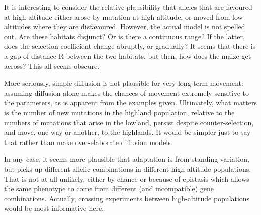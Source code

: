 \documentclass[onecolumn,oneside,letterpaper]{article}
\begin{document}
It is interesting to consider the relative plausibility that alleles that are favoured at high altitude either arose by mutation at high altitude, 
or moved from low altitudes where they are disfavoured.  
However, the actual model is not spelled out.  
Are these habitats disjunct?  
Or is there a continuous range? 
If the latter, does the selection coefficient change abruptly, or gradually?  
It seems that there is a gap of distance R between the two habitats, but then, how does the maize get across?  
This all seems obscure. 



More seriously, simple diffusion is not plausible for very long-term movement: 
assuming diffusion alone makes the chances of movement extremely sensitive to the parameters, 
as is apparent from the examples given.  
Ultimately, what matters is the number of new mutations in the highland population, 
relative to the numbers of mutations that arise in the lowland, 
persist despite counter-selection, and move, one way or another, to the highlands.  
It would be simpler just to say that rather than make over-elaborate diffusion models. 



In any case, it seems more plausible that adaptation is from standing variation, but picks up different allelic combinations in different high-altitude populations.  That is not at all unlikely, either by chance or because of epistasis which allows the same phenotype to come from different (and incompatible) gene combinations.  Actually, crossing experiments between high-altitude populations would be most informative here. 
\end{document}
